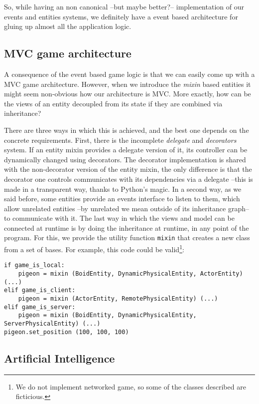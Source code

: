 \documentclass[a4paper,10pt]{article}
\begin{document}
So, while having an non canonical --but maybe better?-- implementation
of our events and entities systems, we definitely have a event based
architecture for gluing up almost all the application logic.

\subsection{MVC game architecture}

A consequence of the event based game logic is that we can easily come
up with a MVC game architecture. However, when we introduce the
\emph{mixin} based entities it might seem non-obvious how our
architecture is MVC. More exactly, how can be the views of an entity
decoupled from its state if they are combined via inheritance?

There are three ways in which this is achieved, and the best one
depends on the concrete requirements. First, there is the incomplete
\emph{delegate} and \emph{decorators} system. If an entity mixin
provides a delegate version of it, its controller can be dynamically
changed using decorators. The decorator implementation is shared with
the non-decorator version of the entity mixin, the only difference is
that the decorator one controls communicates with its dependencies via
a delegate --this is made in a transparent way, thanks to Python's
magic. In a second way, as we said before, some entities provide an
events interface to listen to them, which allow unrelated entities
--by unrelated we mean outside of its inheritance graph-- to
communicate with it. The last way in which the views and model can be
connected at runtime is by doing the inheritance at runtime, in any
point of the program. For this, we provide the utility function
\texttt{mixin} that creates a new class from a set of bases. For
example, this code could be valid\footnote{We do not implement
  networked game, so some of the classes described are ficticious.}:

{\footnotesize
\begin{verbatim}
if game_is_local:
    pigeon = mixin (BoidEntity, DynamicPhysicalEntity, ActorEntity) (...)
elif game_is_client:
    pigeon = mixin (ActorEntity, RemotePhysicalEntity) (...)
elif game_is_server:
    pigeon = mixin (BoidEntity, DynamicPhysicalEntity, ServerPhysicalEntity) (...)
pigeon.set_position (100, 100, 100)
\end{verbatim}
}

\subsection{Artificial Intelligence}
\end{document}
